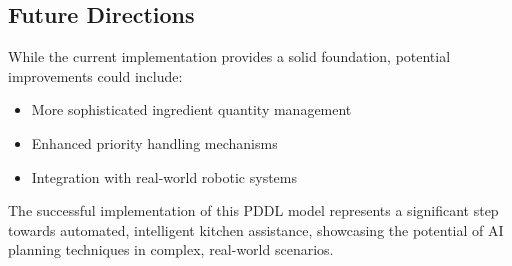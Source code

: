 \documentclass{article}
\begin{document}
\subsection{Future Directions}

While the current implementation provides a solid foundation, potential improvements could include:
\begin{itemize}
    \item More sophisticated ingredient quantity management
    \item Enhanced priority handling mechanisms
    \item Integration with real-world robotic systems
\end{itemize}

The successful implementation of this PDDL model represents a significant step towards automated, intelligent kitchen assistance, showcasing the potential of AI planning techniques in complex, real-world scenarios.


% 
% 
% 
% 
% 
% 
\end{document}
